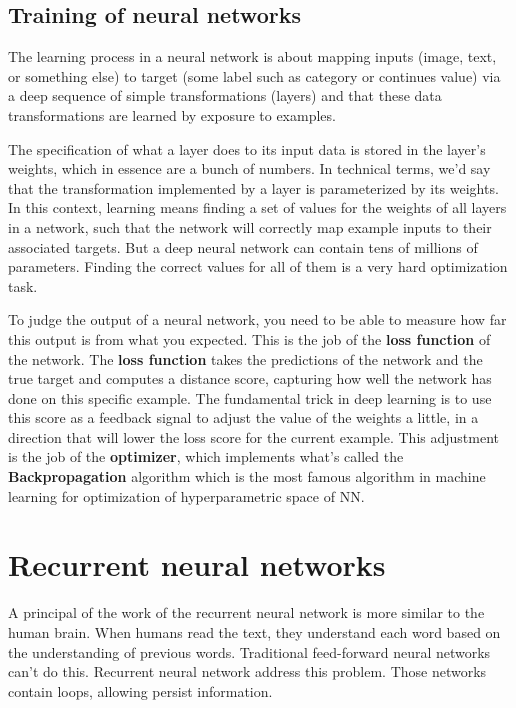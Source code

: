 \documentclass[thesis=M,english]{FITthesis}[2012/10/20]
\begin{document}
\subsection{Training of neural networks}
The learning process in a neural network is about mapping inputs (image, text, or something else) to target (some label such as category or continues value) via a deep sequence of simple transformations (layers) and that these data transformations are learned by exposure to examples. 

The specification of what a layer does to its input data is stored in the layer's weights, which in essence are a bunch of numbers. In technical terms, we'd say that the transformation implemented by a layer is parameterized by its weights. In this context, learning means finding a set of values for the weights of all layers in a network, such that the network will correctly map example inputs to their associated targets. But a deep neural network can contain tens of millions of parameters. Finding the correct values for all of them is a very hard optimization task. 

To judge the output of a neural network, you need to be able to measure how far this output is from what you expected. This is the job of the \textbf{loss function} of the network. The \textbf{loss function} takes the predictions of the network and the true target and computes a distance score, capturing how well the network has done on this specific example. The fundamental trick in deep learning is to use this score as a feedback signal to adjust the value of the weights a little, in a direction that will lower the loss score for the current example. This adjustment is the job of the \textbf{optimizer}, which implements what's called the \textbf{Backpropagation} algorithm which is the most famous algorithm in machine learning for optimization of hyperparametric space of NN.


\section{Recurrent neural networks}
A principal of the work of the recurrent neural network is more similar to the human brain. When humans read the text, they understand each word based on the understanding of previous words. Traditional feed-forward neural networks can't do this. Recurrent neural network address this problem. Those networks contain loops, allowing persist information.
\end{document}
